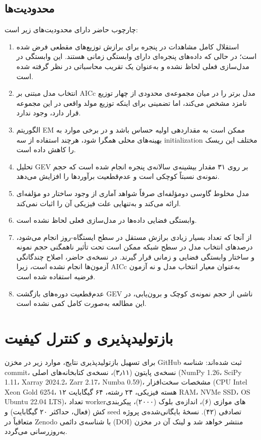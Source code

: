 \documentclass[12pt,a4paper,twocolumn]{article}
\begin{document}
\subsection{محدودیت‌ها}
چارچوب حاضر دارای محدودیت‌های زیر است:
\begin{enumerate}
\item استقلال کامل مشاهدات در پنجره برای برازش توزیع‌های مقطعی فرض شده است؛ در حالی که داده‌های پنجره‌ای دارای وابستگی زمانی هستند. این وابستگی در مدل‌سازی فعلی لحاظ نشده و به‌عنوان یک تقریب محاسباتی در نظر گرفته شده است.
\item انتخاب مدل مبتنی بر AICc مدل برتر را در میان مجموعه‌ی محدودی از چهار توزیع نامزد مشخص می‌کند، اما تضمینی برای اینکه توزیع مولد واقعی در این مجموعه قرار دارد، وجود ندارد.
\item الگوریتم EM ممکن است به مقداردهی اولیه حساس باشد و در برخی موارد به بهینه‌های محلی همگرا شود، هرچند استفاده از سه initialization مختلف این ریسک را کاهش داده است.
\item تحلیل GEV بر روی ۳۱ مقدار بیشینه‌ی سالانه‌ی پنجره انجام شده است که حجم نمونه‌ی نسبتاً کوچکی است و عدم‌قطعیت برآوردها را افزایش می‌دهد.
\item مدل مخلوط گاوسی دومؤلفه‌ای صرفاً شواهد آماری از وجود ساختار دو مؤلفه‌ای ارائه می‌کند و به‌تنهایی علت فیزیکی آن را اثبات نمی‌کند.
\item وابستگی فضایی داده‌ها در مدل‌سازی فعلی لحاظ نشده است.
\item از آنجا که تعداد بسیار زیادی برازش مستقل در سطح ایستگاه-روز انجام می‌شود، درصدهای انتخاب مدل در سطح شبکه ممکن است تحت تأثیر ناهمگنی حجم نمونه و ساختار وابستگی فضایی و زمانی قرار گیرند. در نسخه‌ی حاضر، اصلاح چندگانگی آزمون‌ها انجام نشده است، زیرا AICc به‌عنوان معیار انتخاب مدل و نه آزمون فرضیه استفاده شده است.
\item عدم‌قطعیت دوره‌های بازگشت GEV ناشی از حجم نمونه‌ی کوچک و برون‌یابی، در این مطالعه به‌صورت کامل کمی نشده است.
\end{enumerate}

\section{بازتولیدپذیری و کنترل کیفیت}

برای تسهیل بازتولیدپذیری نتایج، موارد زیر در مخزن GitHub ثبت شده‌اند: شناسه commit، نسخه‌ی پایتون (۳٫۱۱)، نسخه‌ی کتابخانه‌های اصلی (NumPy 1.26، SciPy 1.11، Xarray 2024.2، Zarr 2.17، Numba 0.59)، مشخصات سخت‌افزار (CPU Intel Xeon Gold 6254، ۱۲ هسته فیزیکی، ۲۴ رشته، ۶۴ گیگابایت RAM، NVMe SSD، OS Ubuntu 22.04 LTS)، تعداد workerهای موازی (۶)، اندازه‌ی بلوک (۲۰۰۰)، پیکربندی کش (فعال، حداکثر ۲۰ گیگابایت) و seed تصادفی (۴۲). نسخهٔ بایگانی‌شده‌ی پروژه متعاقباً در Zenodo با شناسه‌ی دائمی (DOI) منتشر خواهد شد و لینک آن در مخزن به‌روزرسانی می‌گردد.
\end{document}
